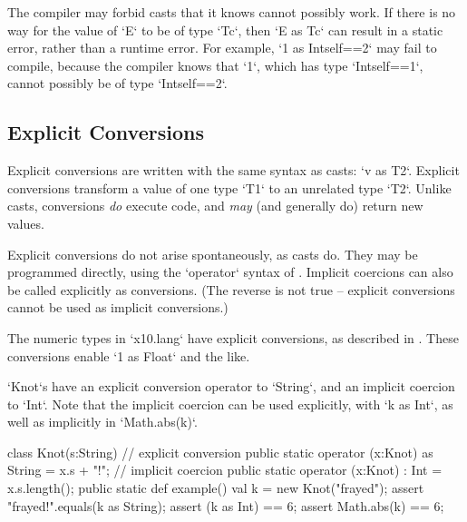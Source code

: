 The compiler may forbid casts that it knows cannot possibly work. If there is
no way for the value of \xcd`E` to be of type \xcd`T{c}`, then 
\xcd`E as T{c}` can result in a static error, rather than a runtime error.  
For example, \xcd`1 as Int{self==2}` may fail to compile, because the compiler
knows that \xcd`1`, which has type \xcd`Int{self==1}`, cannot possibly be of
type \xcd`Int{self==2}`. 

\subsection{Explicit Conversions}

Explicit conversions are written with the same syntax as casts: \xcd`v as T2`.  
Explicit conversions transform a value of one type \xcd`T1` to an unrelated
type \xcd`T2`.  Unlike casts, conversions {\em do} execute code, and {\em may}
(and generally do) return new values.  

Explicit conversions do not arise spontaneously, as casts do. They may be
programmed directly, using the \xcd`operator` syntax of .  
Implicit coercions can also be called explicitly as conversions.  (The reverse
is not true -- explicit conversions cannot be used as implicit conversions.) 

The numeric types in \xcd`x10.lang` have explicit conversions, as described in
.  These conversions enable 
\xcd`1 as Float` and the like.  

\begin{ex}
\xcd`Knot`s have an explicit conversion operator to \xcd`String`, and an
implicit coercion to \xcd`Int`.  Note that the implicit coercion can be used
explicitly, with \xcd`k as Int`, as well as implicitly in \xcd`Math.abs(k)`. 
\begin{xten}
class Knot(s:String) { 
  // explicit conversion
  public static operator (x:Knot) as String = x.s + "!";
  // implicit coercion
  public static operator (x:Knot) : Int = x.s.length();
  public static def example() {
     val k = new Knot("frayed");
     assert "frayed!".equals(k as String);
     assert (k as Int) == 6;
     assert Math.abs(k) == 6; 
  }
}
\end{xten}

\end{ex}




